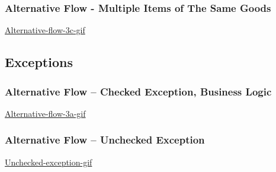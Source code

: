 \documentclass[a4paper]{scrreprt}
\begin{document}
\subsubsection*{Alternative Flow - Multiple Items of The Same Goods}
\href{https://github.com/VincentFerrigan/kth-iv1350-object-oriented-design#alternative-flow---multiple-items-of-the-same-goods}{Alternative-flow-3c-gif}

\subsection*{Exceptions}
\subsubsection*{Alternative Flow -- Checked Exception, Business Logic}
\href{https://github.com/VincentFerrigan/kth-iv1350-object-oriented-design#alternative-flow---checked-exception-business-logic}{Alternative-flow-3a-gif}

\subsubsection*{Alternative Flow -- Unchecked Exception}
\href{https://github.com/VincentFerrigan/kth-iv1350-object-oriented-design#alternative-flow---unchecked-exception}{Unchecked-exception-gif}
\end{document}
